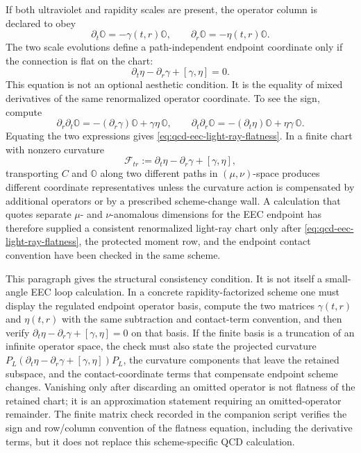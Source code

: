 If both ultraviolet and rapidity scales are present, the operator column is
declared to obey
\[
  \partial_t\mathbb O=-\gamma(t,r)\mathbb O,
  \qquad
  \partial_r\mathbb O=-\eta(t,r)\mathbb O .
\]
The two scale evolutions define a path-independent endpoint coordinate only
if the connection is flat on the chart:
\begin{equation}
  \partial_t\eta-\partial_r\gamma+[\gamma,\eta]=0 .
  \label{eq:qcd-eec-light-ray-flatness}
\end{equation}
This equation is not an optional aesthetic condition.  It is the equality of
mixed derivatives of the same renormalized operator coordinate.  To see the
sign, compute
\[
  \partial_r\partial_t\mathbb O
  =
  -(\partial_r\gamma)\mathbb O+\gamma\eta\,\mathbb O,
  \qquad
  \partial_t\partial_r\mathbb O
  =
  -(\partial_t\eta)\mathbb O+\eta\gamma\,\mathbb O .
\]
Equating the two expressions gives
\eqref{eq:qcd-eec-light-ray-flatness}.  In a finite chart with nonzero
curvature
\[
  \mathcal F_{tr}
  :=
  \partial_t\eta-\partial_r\gamma+[\gamma,\eta],
\]
transporting \(C\) and \(\mathbb O\) along two different paths in
\((\mu,\nu)\)-space produces different coordinate representatives unless the
curvature action is compensated by additional operators or by a prescribed
scheme-change wall.  A calculation that quotes separate \(\mu\)- and
\(\nu\)-anomalous dimensions for the EEC endpoint has therefore supplied a
consistent renormalized light-ray chart only after
\eqref{eq:qcd-eec-light-ray-flatness}, the protected moment row, and the
endpoint contact convention have been checked in the same scheme.

This paragraph gives the structural consistency condition.  It is not itself
a small-angle EEC loop calculation.  In a concrete rapidity-factorized scheme
one must display the regulated endpoint operator basis, compute the two
matrices \(\gamma(t,r)\) and \(\eta(t,r)\) with the same subtraction and
contact-term convention, and then verify
\(\partial_t\eta-\partial_r\gamma+[\gamma,\eta]=0\) on that basis.  If the
finite basis is a truncation of an infinite operator space, the check must
also state the projected curvature
\(P_L(\partial_t\eta-\partial_r\gamma+[\gamma,\eta])P_L\), the curvature
components that leave the retained subspace, and the contact-coordinate
terms that compensate endpoint scheme changes.  Vanishing only after
discarding an omitted operator is not flatness of the retained chart; it is
an approximation statement requiring an omitted-operator remainder.  The
finite matrix check recorded in the companion script verifies the sign and
row/column convention of the flatness equation, including the derivative
terms, but it does not replace this scheme-specific QCD calculation.

